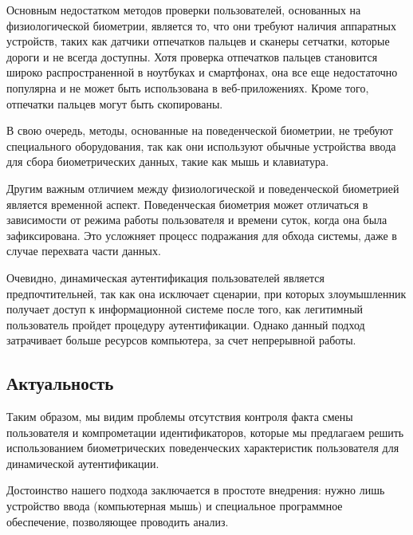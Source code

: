 \documentclass[12pt]{article}
\begin{document}
    \par Основным недостатком методов проверки пользователей, основанных на физиологической биометрии, является то, что они требуют наличия аппаратных устройств, таких как датчики отпечатков пальцев и сканеры сетчатки, которые дороги и не всегда доступны. Хотя проверка отпечатков пальцев становится широко распространенной в ноутбуках и смартфонах, она все еще недостаточно популярна и не может быть использована в веб-приложениях. Кроме того, отпечатки пальцев могут быть скопированы.

    \par В свою очередь, методы, основанные на поведенческой биометрии, не требуют специального оборудования, так как они используют обычные устройства ввода для сбора биометрических данных, такие как мышь и клавиатура.

    \par Другим важным отличием между физиологической и поведенческой биометрией является временной аспект. Поведенческая биометрия может отличаться в зависимости от режима работы пользователя и времени суток, когда она была зафиксирована. Это усложняет процесс подражания для обхода системы, даже в случае перехвата части данных.

    \par Очевидно, динамическая аутентификация пользователей является предпочтительней, так как она исключает сценарии, при которых злоумышленник получает доступ к информационной системе после того, как легитимный пользователь пройдет процедуру аутентификации. Однако данный подход затрачивает больше ресурсов компьютера, за счет непрерывной работы.


    \subsection{Актуальность}
    \label{sec:Intro:Relevance}

    \par Таким образом, мы видим проблемы отсутствия контроля факта смены пользователя и компрометации идентификаторов, которые мы предлагаем решить использованием биометрических поведенческих характеристик пользователя для динамической аутентификации.

    \par Достоинство нашего подхода заключается в простоте внедрения: нужно лишь устройство ввода (компьютерная мышь) и специальное программное обеспечение, позволяющее проводить анализ.

    \newpage
\end{document}
